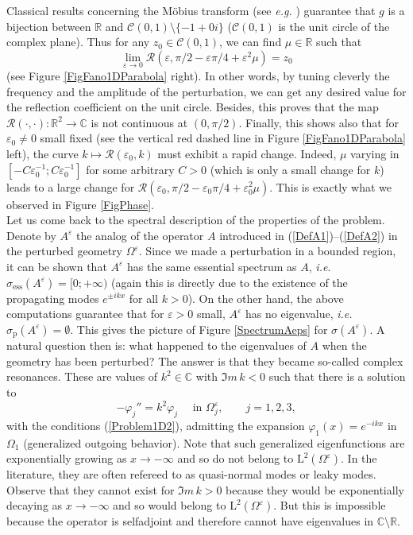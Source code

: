 \documentclass[11pt,a4paper]{report}
\newcommand{\eps}{\varepsilon}
\newcommand{\Om}{\Omega}
\newcommand{\mrm}[1]{\mathrm{#1}}
\newcommand{\Cplx}{\mathbb{C}}
\newcommand{\R}{\mathbb{R}}
\newcommand{\mL}{\mrm{L}}
\begin{document}
\noindent Classical results concerning the M\"{o}bius transform (see \textit{e.g.}  \cite[Chap.\,5]{Henr74}) guarantee that $g$ is a bijection between $\R$ and $\mathscr{C}(0,1)\setminus\{-1+0i\}$ ($\mathscr{C}(0,1)$ is the unit circle of the complex plane). Thus for any $z_0\in\mathscr{C}(0,1)$, we can find $\mu\in\R$ such that 
\[
\lim_{\eps\to0}\mathcal{R}(\eps,\pi/2-\eps\pi/4+\eps^2\mu)=z_0
\]
(see Figure \ref{FigFano1DParabola} right). In other words, by tuning cleverly the frequency and the amplitude of the perturbation, we can get any desired value for the reflection coefficient on the unit circle. 
Besides, this proves that the map $\mathcal{R}(\cdot,\cdot):\R^2\to\Cplx$ is not continuous at $(0,\pi/2)$. Finally, this shows also that for $\eps_0\ne0$ small fixed (see the vertical red dashed line in Figure \ref{FigFano1DParabola} left), the curve $k\mapsto \mathcal{R}(\eps_0,k)$ must exhibit a rapid change. Indeed, $\mu$ varying in $[-C\eps_0^{-1};C\eps_0^{-1}]$ for some arbitrary $C>0$ (which is only a small change for $k$) leads to a large change for $\mathcal{R}(\eps_0,\pi/2-\eps_0\pi/4+\eps_0^2\mu)$. This is exactly what we observed in Figure \ref{FigPhase}.\\
\newline
Let us come back to the spectral description of the properties  of the problem. Denote by $A^\eps$ the analog of the operator $A$ introduced in (\ref{DefA1})--(\ref{DefA2}) in the perturbed geometry $\Om^\eps$. Since we made a perturbation in a bounded region, it can be shown that $A^\eps$ has the same essential spectrum as $A$, \textit{i.e.} $\sigma_{\mrm{ess}}(A^\eps)=[0;+\infty)$ (again this is directly due to the existence of the propagating modes $e^{\pm ikx}$ for all $k>0$). On the other hand, the above computations guarantee that for $\eps>0$ small, $A^\eps$ has no eigenvalue, \textit{i.e.} $\sigma_{\mrm{p}}(A^\eps)=\emptyset$. This gives the picture of Figure \ref{SpectrumAeps} for $\sigma(A^\eps)$. A natural question then is: what happened to the eigenvalues of $A$ when the geometry has been perturbed? The answer is that they became so-called complex resonances. These are values of $k^2\in\Cplx$ with $\Im m\, k<0$ such that there is a solution to 
\begin{equation}\label{PbCplxRes}
-\varphi_j''=k^2\varphi_j\quad\mbox{ in }\Om^\eps_j,\qquad j=1,2,3,
\end{equation}
with the conditions (\ref{Problem1D2}), admitting the expansion $\varphi_1(x)=e^{-ikx}$ in $\Om_1$ (generalized outgoing behavior). Note that such generalized eigenfunctions are exponentially growing as $x\to-\infty$ and so do not belong to $\mL^2(\Om^\eps)$. In the literature, they are often refereed to as quasi-normal modes or leaky modes. Observe that they cannot exist for $\Im m\,k>0$ because they would be exponentially decaying as $x\to-\infty$ and so would belong to $\mL^2(\Om^\eps)$. But this is impossible because the operator is selfadjoint and therefore cannot have eigenvalues in $\Cplx\setminus\R$.
\end{document}

